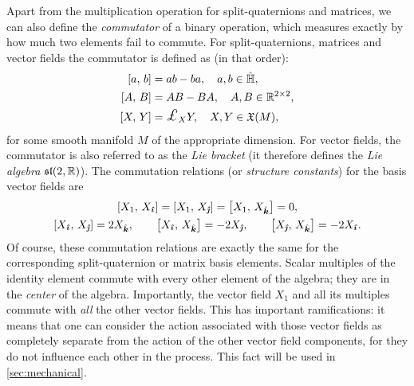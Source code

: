 Apart from the multiplication operation for split-quaternions and matrices, we can also define the \emph{commutator} of a binary operation, which measures exactly by how much two elements fail to commute. For split-quaternions, matrices and vector fields the commutator is defined as (in that order): 
\begin{equation}
    \begin{split}
        \liebr{a}{b} &= ab - ba,\quad a, b \in \spquaternions, \\
        \liebr{A}{B} &= AB - BA,\quad A, B \in \real^{2\times 2}, \\
        \liebr{X}{Y} &= \lied{X}{Y},\quad X,Y\in \vfields{M},
    \end{split}
\end{equation}
for some smooth manifold $M$ of the appropriate dimension. For vector fields, the commutator is also referred to as the \emph{Lie bracket} (it therefore defines the \emph{Lie algebra} $\mathfrak{sl}(2, \mathbb{R})$). The commutation relations (or \emph{structure constants}) for the basis vector fields are \cite{Schuller2014}
\begin{gather}
    \liebr{X_1}{X_{\quati}} = \liebr{X_1}{X_{\quatj}} = \liebr{X_1}{X_{\quatk}} = 0, \\
    \liebr{X_{\quati}}{X_{\quatj}} = 2X_{\quatk}, \qquad  
    \liebr{X_{\quati}}{X_{\quatk}} = -2X_{\quatj}, \qquad
    \liebr{X_{\quatj}}{X_{\quatk}} = -2X_{\quati}.
\end{gather}
Of course, these commutation relations are exactly the same for the corresponding split-quaternion or matrix basis elements. Scalar multiples of the identity element commute with every other element of the algebra; they are in the \emph{center} of the algebra. Importantly, the vector field $X_1$ and all its multiples commute with 
\emph{all} the other vector fields. This has important ramifications: it means that one can consider the action associated with those vector fields as completely separate from the action of the other vector field components, for they do not influence each other in the process. This fact will be used in \cref{sec:mechanical}.

